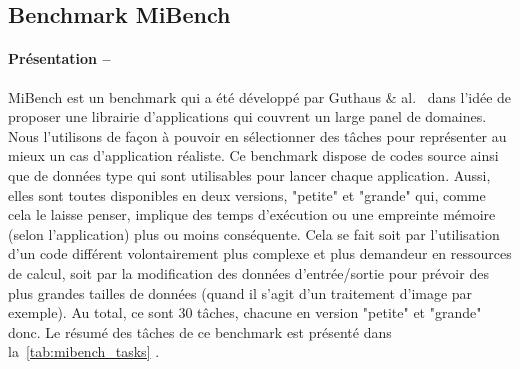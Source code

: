 \documentclass[french, a4paper, 11pt, twoside, pdftex]{StyleThese}
\begin{document}
        \subsection{Benchmark MiBench}
        \paragraph{Présentation --} MiBench est un benchmark qui a été développé par Guthaus \& al.~\cite{guthaus_mibench_2001} dans l'idée de proposer une librairie d'applications qui couvrent un large panel de domaines. Nous l'utilisons de façon à pouvoir en sélectionner des tâches pour représenter au mieux un cas d'application réaliste. 
        Ce benchmark dispose de codes source ainsi que de données type qui sont utilisables pour lancer chaque application. Aussi, elles sont toutes disponibles en deux versions, "petite" et "grande" qui, comme cela le laisse penser, implique des temps d'exécution ou une empreinte mémoire (selon l'application) plus ou moins conséquente. Cela se fait soit par l'utilisation d'un code différent volontairement plus complexe et plus demandeur en ressources de calcul, soit par la modification des données d'entrée/sortie pour prévoir des plus grandes tailles de données (quand il s'agit d'un traitement d'image par exemple). Au total, ce sont 30 tâches, chacune en version "petite" et "grande" donc. Le résumé des tâches de ce benchmark est présenté dans la~\autoref{tab:mibench_tasks} .
\end{document}
